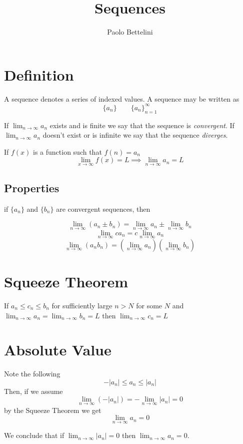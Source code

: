 \documentclass[a4paper]{article}
\title{Sequences}
\author{Paolo Bettelini}
\date{}
\begin{document}
\maketitle
\tableofcontents
\pagebreak

\section{Definition}

A sequence denotes a series of indexed values.
A sequence may be written as
\[
    \{a_n\} \quad \quad {\{a_n\}}_{n=1}^\infty
\]

If \(\lim_{n \to \infty}a_n\) exists and is finite
we say that the sequence is \textit{convergent}. If 
\(\lim_{n \to \infty}a_n\) doesn't exist or is infinite
we say that the sequence \textit{diverges}.

If \(f(x)\) is a function such that \(f(n)=a_n\)
\[
    \lim_{x\to\infty}f(x)=L \implies
    \lim_{n\to\infty}a_n=L
\]

\subsection{Properties}

if \(\{a_n\}\) and \(\{b_n\}\) are convergent sequences, then

\[
    \lim_{n\to\infty} (a_n \pm b_n) = \lim_{n\to\infty} a_n \pm
    \lim_{n\to\infty} b_n
\]
\[
    \lim_{n\to\infty} ca_n = c \lim_{n\to\infty} a_n
\]
\[
    \lim_{n\to\infty} (a_n b_n) =
    \left(\lim_{n\to\infty} a_n\right)
    \left(\lim_{n\to\infty} b_n\right)
\]

\section{Squeeze Theorem}

If \(a_n \leq c_n \leq b_n\) for sufficiently large \(n>N\) for some \(N\)
and \(\lim_{n\to\infty}a_n =\lim_{n\to\infty}b_n=L\)
then \(\lim_{n\to\infty} c_n =L\)

\section{Absolute Value}

Note the following
\[
    -|a_n| \leq a_n \leq |a_n|
\]
Then, if we assume
\[
    \lim_{n\to\infty} (-|a_n|) = - \lim_{n\to\infty} |a_n| =0 
\]
by the Squeeze Theorem we get
\[
    \lim_{n\to\infty} a_n =0
\]

We conclude that if \(\lim_{n\to\infty} |a_n|=0\) then
\(\lim_{n\to\infty} a_n=0\).
\end{document}
